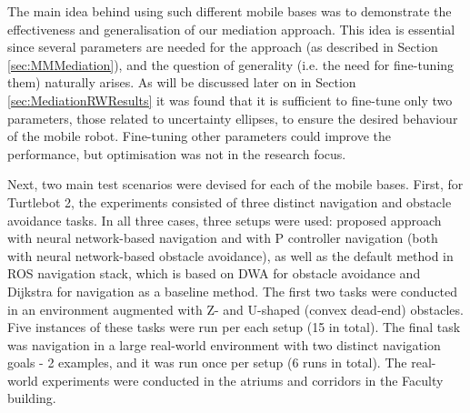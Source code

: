The main idea behind using such different mobile bases was to demonstrate the effectiveness and generalisation of our mediation approach. This idea is essential since several parameters are needed for the approach (as described in Section \ref{sec:MMMediation}), and the question of generality (i.e. the need for fine-tuning them) naturally arises. As will be discussed later on in Section \ref{sec:MediationRWResults} it was found that it is sufficient to fine-tune only two parameters, those related to uncertainty ellipses, to ensure the desired behaviour of the mobile robot. Fine-tuning other parameters could improve the performance, but optimisation was not in the research focus.

Next, two main test scenarios were devised for each of the mobile bases. First, for Turtlebot 2, the experiments consisted of three distinct navigation and obstacle avoidance tasks. In all three cases, three setups were used: proposed approach with neural network-based navigation and with P controller navigation (both with neural network-based obstacle avoidance), as well as the default method in ROS navigation stack, which is based on DWA for obstacle avoidance and Dijkstra for navigation as a baseline method. The first two tasks were conducted in an environment augmented with Z- and U-shaped (convex dead-end) obstacles. Five instances of these tasks were run per each setup (15 in total). The final task was navigation in a large real-world environment with two distinct navigation goals - 2 examples, and it was run once per setup (6 runs in total). The real-world experiments were conducted in the atriums and corridors in the Faculty building.

